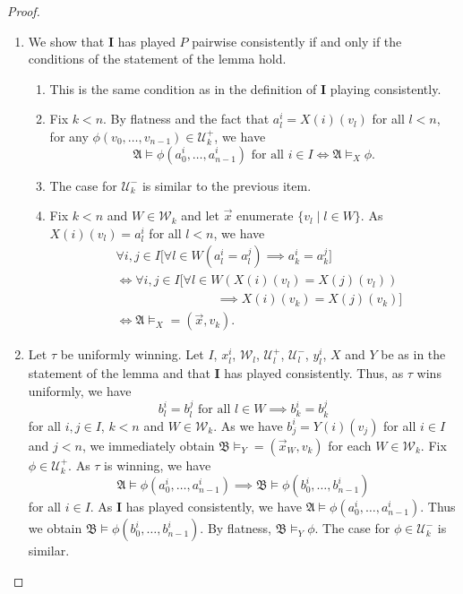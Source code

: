 \documentclass[12pt]{article}
\theoremstyle{definition}
\newcommand{\playerone}{\mathrm{\mathbf{I}}}
\newcommand{\W}{\mathcal W}
\newcommand{\U}{\mathcal U}
\newcommand{\A}{\mathfrak{A}}
\newcommand{\B}{\mathfrak{B}}
\newcommand{\dep}{\mathop{=}}
\begin{document}
\begin{proof}\quad
    \begin{enumerate}
        \item We show that $\playerone$ has played $P$ pairwise consistently if and only if the conditions of the statement of the lemma hold.
        \begin{enumerate}
            \item This is the same condition as in the definition of $\playerone$ playing consistently.
            \item Fix $k<n$. By flatness and the fact that $a^i_l = X(i)(v_l)$ for all $l<n$, for any $\phi(v_0,\dots,v_{n-1})\in\U^+_k$, we have
            \[
                \text{$\A\models\phi(a_0^i,\dots,a_{n-1}^i)$ for all $i\in I$} \iff \A\models_X\phi.
            \]
            \item The case for $\U^-_k$ is similar to the previous item.
            \item Fix $k<n$ and $W\in\W_k$ and let $\vec x$ enumerate $\{v_l \mid l\in W\}$. As $X(i)(v_l) = a^i_l$ for all $l<n$, we have
            \begin{align*}
                &\forall i,j\in I \bigg[ \forall l\in W (a^i_l = a^j_l) \implies a^i_k = a^j_k \bigg] \\
                &\iff \forall i,j\in I \bigg[ \forall l\in W (X(i)(v_l) = X(j)(v_l)) \\
                &\hspace{8em}\implies X(i)(v_k) = X(j)(v_k) \bigg] \\
                &\iff \A\models_X\dep(\vec x, v_k).
            \end{align*}
        \end{enumerate}

        \item Let $\tau$ be uniformly winning. Let $I$, $x^i_l$, $\W_l$, $\U^+_l$, $\U^-_l$, $y^i_l$, $X$ and $Y$ be as in the statement of the lemma and that $\playerone$ has played consistently. Thus, as $\tau$ wins uniformly, we have
        \[
            \text{$b^i_l = b^j_l$ for all $l\in W$} \implies b^i_k = b^j_k
        \]
        for all $i,j\in I$, $k<n$ and $W\in\W_k$. As we have $b^i_j = Y(i)(v_j)$ for all $i\in I$ and $j<n$, we immediately obtain $\B\models_Y\dep(\vec x_W,v_k)$ for each $W\in\W_k$. Fix $\phi\in\U^+_k$. As $\tau$ is winning, we have
        \[
            \A\models\phi(a^i_0,\dots,a^i_{n-1}) \implies \B\models\phi(b^i_0,\dots,b^i_{n-1})
        \]
        for all $i\in I$. As $\playerone$ has played consistently, we have $\A\models\phi(a^i_0,\dots,a^i_{n-1})$. Thus we obtain $\B\models\phi(b^i_0,\dots,b^i_{n-1})$. By flatness, $\B\models_Y\phi$. The case for $\phi\in\U^-_k$ is similar.
    

\end{enumerate}
\end{proof}
\end{document}
